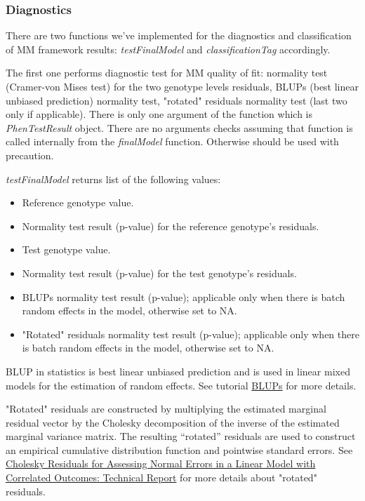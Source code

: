 \documentclass[12pt,a4paper]{article}
\begin{document}
\subsubsection{Diagnostics}
There are two functions we've implemented for the diagnostics and classification of MM framework results: \textit{testFinalModel} and \textit{classificationTag} accordingly.
 
The first one performs diagnostic test for MM quality of fit: normality test (Cramer-von Mises test) for the two genotype levels residuals, BLUPs (best linear unbiased prediction) normality test, 
"rotated" residuals normality test (last two only if applicable). There is only one argument of the function which is \textit{PhenTestResult} object. There are no arguments checks assuming that 
function is called internally from the \textit{finalModel} function. Otherwise should be used with precaution. 

 \textit{testFinalModel} returns list of the following values:
 \begin{itemize}
  \item Reference genotype value.
  \item Normality test result (p-value) for the reference genotype's residuals.
  \item Test genotype value.
  \item Normality test result (p-value) for the test genotype's residuals.
  \item BLUPs normality test result (p-value); applicable only when there is batch random effects in the model, otherwise set to NA.
  \item "Rotated" residuals normality test result (p-value); applicable only when there is batch random effects in the model, otherwise set to NA.
 \end{itemize}

BLUP in statistics is best linear unbiased prediction and is used in linear mixed models for the estimation of random effects. 
See tutorial \href{http://www.extension.org/pages/61006/the-solcap-tomato-phenotypic-data:-estimating-heritability-and-blups-for-traits#.Ui4zjWRgYXc}{BLUPs} for more details.

"Rotated" residuals are constructed by multiplying the estimated marginal residual vector by
the Cholesky decomposition of the inverse of the estimated marginal variance
matrix. The resulting “rotated” residuals are used to construct an empirical cumulative distribution function and pointwise standard errors. See
\href{http://biostats.bepress.com/cgi/viewcontent.cgi?article=1019&context=harvardbiostat}{Cholesky Residuals for Assessing Normal
Errors in a Linear Model with Correlated
Outcomes: Technical Report} for more details about "rotated" residuals.
\end{document}
